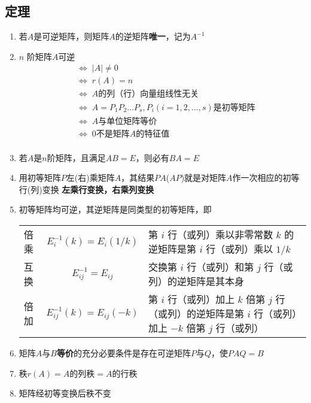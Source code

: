 \documentclass[a4paper,12pt]{article}
\begin{document}
    \subsection{定理}

    \begin{enumerate}
        \item 若$A$是可逆矩阵，则矩阵$A$的逆矩阵\textbf{唯一}，记为$A^{-1}$
        \item $n$ 阶矩阵$A$可逆
        \begin{align*}
            &\Leftrightarrow\; |A| \neq 0  \\
            &\Leftrightarrow\; r(A) = n  \\
            &\Leftrightarrow\; A \text{的列（行）向量组线性无关}  \\
            &\Leftrightarrow\; A = P_{1}P_{2}\dots P_{s}, P_{i}(i = 1,2,\dots,s)\text{是初等矩阵}  \\
            &\Leftrightarrow\; A \text{与单位矩阵等价}  \\
            &\Leftrightarrow\; 0\text{不是矩阵} A \text{的特征值}  \\
        \end{align*}
        \item 若$A$是$n$阶矩阵，且满足$AB = E$，则必有$BA = E$
        \item 用初等矩阵$P$左(右)乘矩阵$A$，其结果$PA$($AP$)就是对矩阵$A$作一次相应的初等行(列)变换 \Rightarrow \textbf{左乘行变换，右乘列变换}
        \item 初等矩阵均可逆，其逆矩阵是同类型的初等矩阵，即

        \renewcommand{\arraystretch}{1.2}  %
        \begin{tabularx}{\textwidth}{l c >{\raggedright\arraybackslash}X}
            倍乘 & $E_i^{-1}(k) = E_i(1/k)$      & 第 $i$ 行（或列）乘以非零常数 $k$ 的逆矩阵是第 $i$ 行（或列）乘以 $1/k$                     \\
            互换 & $E_{ij}^{-1} = E_{ij}$        & 交换第 $i$ 行（或列）和第 $j$ 行（或列）的逆矩阵是其本身                                  \\
            倍加 & $E_{ij}^{-1}(k) = E_{ij}(-k)$ & 第 $i$ 行（或列）加上 $k$ 倍第 $j$ 行（或列）的逆矩阵是第 $i$ 行（或列）加上 $-k$ 倍第 $j$ 行（或列） \\
        \end{tabularx}
        \item 矩阵$A$与$B$\textbf{等价}的充分必要条件是存在可逆矩阵$P$与$Q$，使$PAQ = B$
        \item 秩$r(A) = A \text{的列秩} = A \text{的行秩}$
        \item 矩阵经初等变换后秩不变
    \end{enumerate}
\end{document}
